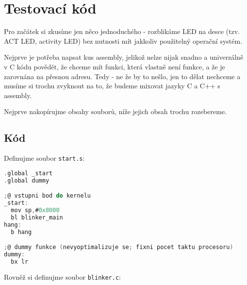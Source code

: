 \documentclass{article}
\begin{document}
\section{Testovací kód}

Pro začátek si zkusíme jen něco jednoduchého - rozblikáme LED na desce (tzv. ACT LED, activity LED) bez nutnosti mít jakkoliv použitelný operační systém.

Nejprve je potřeba napsat kus assembly, jelikož nelze nijak snadno a univerzálně v C kódu povědět, že chceme mít funkci, která vlastně není funkce, a že je zarovnána na přesnou adresu. Tedy - ne že by to nešlo, jen to dělat nechceme a musíme si trochu zvyknout na to, že budeme mixovat jazyky C a C++ s assembly.

Nejprve nakopírujme obsahy souborů, níže jejich obsah trochu rozebereme.

\subsection{Kód}

Definujme soubor \texttt{start.s}:

\begin{lstlisting}[language=C]
.global _start
.global dummy

;@ vstupni bod do kernelu
_start:
  mov sp,#0x8000
  bl blinker_main
hang:
  b hang

;@ dummy funkce (nevyoptimalizuje se; fixni pocet taktu procesoru)
dummy:
  bx lr
\end{lstlisting}

Rovněž si definujme soubor \texttt{blinker.c}:
\end{document}
